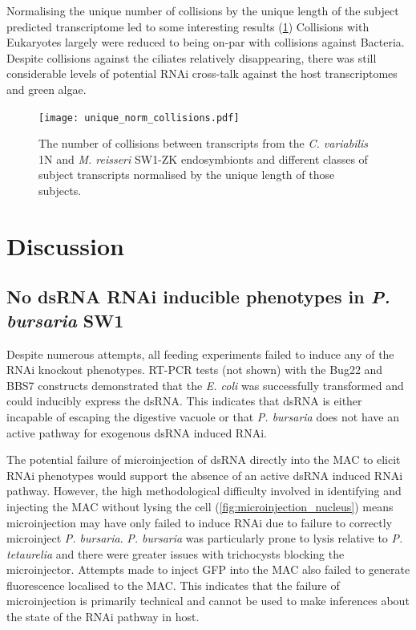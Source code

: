 Normalising the unique number of collisions by the unique length of
the subject predicted transcriptome led to some interesting results (\cref{fig:edicer_unique_norm})
Collisions with Eukaryotes largely were reduced to being on-par
with collisions against Bacteria.
Despite collisions against the ciliates relatively disappearing,
there was still considerable levels of potential RNAi cross-talk against
the host transcriptomes and green algae.

\begin{figure}
    \centering
    \texttt{[image: unique\_norm\_collisions.pdf]}
    \caption[Normalised Unique eDicer Collisions]{The number of collisions
        between transcripts from the \textit{C. variabilis} 1N
    and \textit{M. reisseri} SW1-ZK endosymbionts and different
classes of subject transcripts normalised by the unique length of those
subjects.}
    \label{fig:edicer_unique_norm}
\end{figure}

\section{Discussion}

\subsection{No dsRNA RNAi inducible phenotypes in \textit{P. bursaria} SW1}

Despite numerous attempts, all feeding experiments failed to induce
any of the RNAi knockout phenotypes.  RT-PCR tests (not shown) with the Bug22
and BBS7 constructs demonstrated
that the \textit{E. coli} was successfully transformed and could 
inducibly express the dsRNA.  
This indicates that dsRNA is either incapable of escaping the digestive vacuole
or that \textit{P. bursaria} does not have an active pathway for exogenous dsRNA 
induced RNAi.

The potential failure of microinjection of dsRNA directly into the MAC
to elicit RNAi phenotypes would support the absence
of an active dsRNA induced RNAi pathway. 
However, the high methodological difficulty involved in identifying and injecting
the MAC without lysing the cell (\cref{fig:microinjection_nucleus}) 
means microinjection may have only failed to induce RNAi due to failure
to correctly microinject \textit{P. bursaria}.   \textit{P. bursaria}
was particularly prone to lysis relative to \textit{P. tetaurelia} and
there were greater issues with trichocysts blocking the microinjector. 
Attempts made to inject GFP into the MAC also failed to generate fluorescence
localised to the MAC.  This indicates that the failure of microinjection is
primarily technical and cannot be used to make inferences about the state
of the RNAi pathway in host. 

